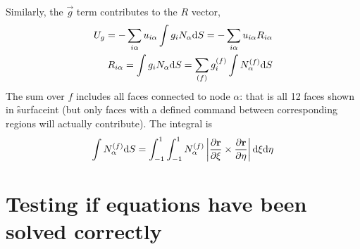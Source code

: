 \documentclass[a4paper]{article}
\begin{document}
Similarly, the $\vec g$ term contributes to the $R$ vector,
\begin{eqnarray}
U_g=-\sum_{i\alpha} u_{i\alpha} \int g_i N_\alpha \mathrm{d} S=-\sum_{i\alpha} u_{i\alpha}R_{i\alpha}\\
R_{i\alpha}=\int g_i N_\alpha \mathrm{d} S=\sum_{(f)} g_i^{(f)}\int N_\alpha^{(f)}\mathrm{d} S
\end{eqnarray}
The sum over $f$ includes all faces connected to node $\alpha$: that
is all 12 faces shown in \f{surfaceint} (but only faces with a defined
 command between corresponding regions will actually contribute). The integral is
\begin{eqnarray}
  \int N_\alpha^{(f)}\mathrm{d} S
=\int_{-1}^1\int_{-1}^1 N_\alpha^{(f)}
\left|\frac{\partial\mathbf{r}}{\partial\xi}\times
\frac{\partial\mathbf{r}}{\partial\eta}\right|\mathrm{d}\xi\mathrm{d}\eta
\end{eqnarray}

\section{Testing if equations have been solved correctly}
\end{document}
